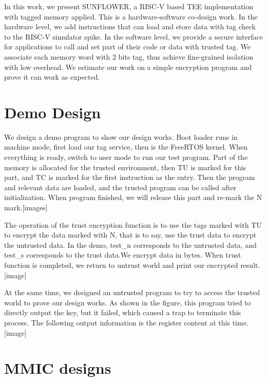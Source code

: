 \documentclass[conference]{IEEEtran}
\begin{document}
In this work, we present SUNFLOWER, a RISC-V based TEE implementation with tagged memory applied. This is a hardware-software co-design work. In the hardware level, we add instructions that can load and store data with tag check to the RISC-V simulator spike. In the software level, we provide a secure interface for applications to call and set part of their code or data with trusted tag. We associate each memory word with 2 bits tag, thus achieve fine-grained isolation with low overhead. We estimate our work on a simple encryption program and prove it can work as expected. 



\section{Demo Design}
We design a demo program to show our design works. Boot loader runs in machine mode, first load our tag service, then is the FreeRTOS kernel. When everything is ready, switch to user mode to run our test program. Part of the memory is allocated for the trusted environment, then TU is marked for this part, and TC is marked for the first instruction as the entry. Then the program and relevant data are loaded, and the trusted program can be called after initialization. When program finished, we will release this part and re-mark the N mark.[images]

The operation of the trust encryption function is to use the tags marked with TU to encrypt the data marked with N, that is to say, use the trust data to encrypt the untrusted data. In the demo, test\_n corresponds to the untrusted data, and test\_s corresponds to the trust data.We encrypt data in bytes. When  trust function is completed, we return to untrust world and print our encrypted result.[image]

At the same time, we designed an untrusted program to try to access the trusted world to prove our design works. As shown in the figure, this program tried to directly output the key, but it failed, which caused a trap to terminate this process. The following output information is the register content at this time.[image]




\section{MMIC designs}
\end{document}
